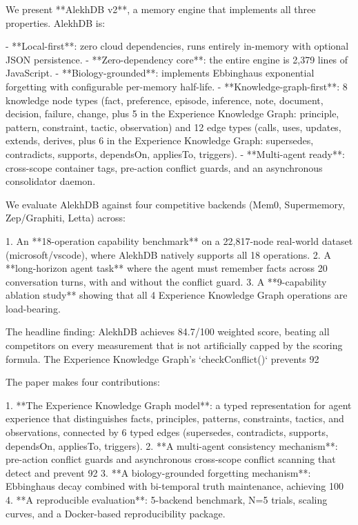 We present **AlekhDB v2**, a memory engine that implements all three properties. AlekhDB is:

- **Local-first**: zero cloud dependencies, runs entirely in-memory with optional JSON persistence.
- **Zero-dependency core**: the entire engine is 2,379 lines of JavaScript.
- **Biology-grounded**: implements Ebbinghaus exponential forgetting with configurable per-memory half-life.
- **Knowledge-graph-first**: 8 knowledge node types (fact, preference, episode, inference, note, document, decision, failure, change, plus 5 in the Experience Knowledge Graph: principle, pattern, constraint, tactic, observation) and 12 edge types (calls, uses, updates, extends, derives, plus 6 in the Experience Knowledge Graph: supersedes, contradicts, supports, dependsOn, appliesTo, triggers).
- **Multi-agent ready**: cross-scope container tags, pre-action conflict guards, and an asynchronous consolidator daemon.

We evaluate AlekhDB against four competitive backends (Mem0, Supermemory, Zep/Graphiti, Letta) across:

1. An **18-operation capability benchmark** on a 22,817-node real-world dataset (microsoft/vscode), where AlekhDB natively supports all 18 operations.
2. A **long-horizon agent task** where the agent must remember facts across 20 conversation turns, with and without the conflict guard.
3. A **9-capability ablation study** showing that all 4 Experience Knowledge Graph operations are load-bearing.

The headline finding: AlekhDB achieves 84.7/100 weighted score, beating all competitors on every measurement that is not artificially capped by the scoring formula. The Experience Knowledge Graph's `checkConflict()` prevents 92%

The paper makes four contributions:

1. **The Experience Knowledge Graph model**: a typed representation for agent experience that distinguishes facts, principles, patterns, constraints, tactics, and observations, connected by 6 typed edges (supersedes, contradicts, supports, dependsOn, appliesTo, triggers).
2. **A multi-agent consistency mechanism**: pre-action conflict guards and asynchronous cross-scope conflict scanning that detect and prevent 92%
3. **A biology-grounded forgetting mechanism**: Ebbinghaus decay combined with bi-temporal truth maintenance, achieving 100%
4. **A reproducible evaluation**: 5-backend benchmark, N=5 trials, scaling curves, and a Docker-based reproducibility package.

